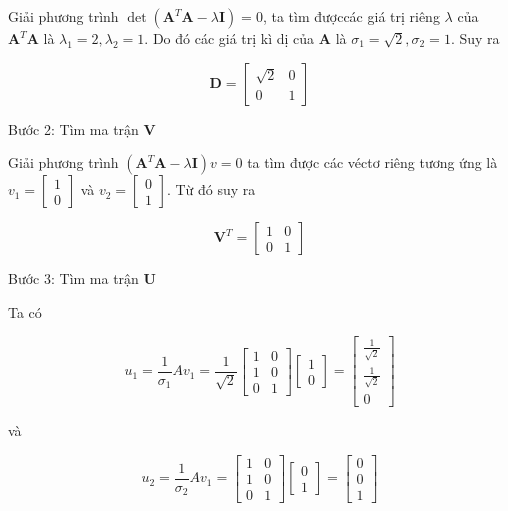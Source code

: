 \documentclass[12pt,a4paper,oneside]{report}
\numberwithin{equation}{section}
\begin{document}
Giải phương trình $\operatorname{det}\left(\mathbf{A}^{T} \mathbf{A}-\lambda \mathbf{I}\right)=0$, ta tìm đượccác giá trị riêng $\lambda$ của $\mathbf{A}^{T} \mathbf{A}$ là $\lambda_{1}=2, \lambda_{2}=1$. Do đó các giá trị kì dị của $\mathbf{A}$ là $\sigma_{1}=\sqrt{2}, \sigma_{2}=1$. Suy ra

$$
\mathbf{D}=\left[\begin{array}{cc}
	\sqrt{2} & 0 \\
	0 & 1
\end{array}\right]
$$

Bước 2: Tìm ma trận $\mathbf{V}$

Giải phương trình $\left(\mathbf{A}^{T} \mathbf{A}-\lambda \mathbf{I}\right) v=0$ ta tìm được các véctơ riêng tương ứng là $v_{1}=\left[\begin{array}{l}1 \\ 0\end{array}\right]$ và $v_{2}=\left[\begin{array}{l}0 \\ 1\end{array}\right]$. Từ đó suy ra

$$
\mathbf{V}^{T}=\left[\begin{array}{ll}
	1 & 0 \\
	0 & 1
\end{array}\right]
$$

Bước 3: Tìm ma trận $\mathbf{U}$

Ta có

$$
u_{1}=\frac{1}{\sigma_{1}} A v_{1}=\frac{1}{\sqrt{2}}\left[\begin{array}{ll}
	1 & 0 \\
	1 & 0 \\
	0 & 1
\end{array}\right]\left[\begin{array}{l}
	1 \\
	0
\end{array}\right]=\left[\begin{array}{c}
	\frac{1}{\sqrt{2}} \\
	\frac{1}{\sqrt{2}} \\
	0
\end{array}\right]
$$

và

$$
u_{2}=\frac{1}{\sigma_{2}} A v_{1}=\left[\begin{array}{ll}
	1 & 0 \\
	1 & 0 \\
	0 & 1
\end{array}\right]\left[\begin{array}{l}
	0 \\
	1
\end{array}\right]=\left[\begin{array}{l}
	0 \\
	0 \\
	1
\end{array}\right]
$$
\end{document}
